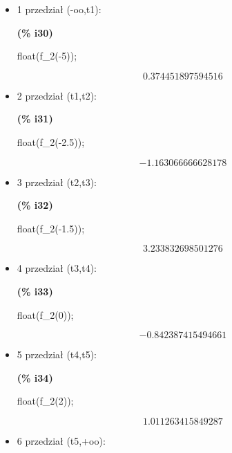 \documentclass[a4paper]{article}
\begin{document}
\begin{itemize}
	\item 1 przedział (-oo,t1):

\noindent
\begin{minipage}[t]{4.000000em}\color{red}\bfseries
(\% i30)	
\end{minipage}
\begin{minipage}[t]{\textwidth}\color{blue}
float(f\_2(-5));
\end{minipage}
\[\displaystyle \tag{\% o30} 
0.374451897594516\mbox{}
\]

\item 2 przedział (t1,t2):


\noindent
\begin{minipage}[t]{4.000000em}\color{red}\bfseries
(\% i31)	
\end{minipage}
\begin{minipage}[t]{\textwidth}\color{blue}
float(f\_2(-2.5));
\end{minipage}
\[\displaystyle \tag{\% o31} 
-1.163066666628178\mbox{}
\]
\item 3 przedział (t2,t3):


\noindent
\begin{minipage}[t]{4.000000em}\color{red}\bfseries
(\% i32)	
\end{minipage}
\begin{minipage}[t]{\textwidth}\color{blue}
float(f\_2(-1.5));
\end{minipage}
\[\displaystyle \tag{\% o32} 
3.233832698501276\mbox{}
\]
\item 4 przedział (t3,t4):


\noindent
\begin{minipage}[t]{4.000000em}\color{red}\bfseries
(\% i33)	
\end{minipage}
\begin{minipage}[t]{\textwidth}\color{blue}
float(f\_2(0));
\end{minipage}
\[\displaystyle \tag{\% o33} 
-0.842387415494661\mbox{}
\]
\item 5 przedział (t4,t5):


\noindent
\begin{minipage}[t]{4.000000em}\color{red}\bfseries
(\% i34)	
\end{minipage}
\begin{minipage}[t]{\textwidth}\color{blue}
float(f\_2(2));
\end{minipage}
\[\displaystyle \tag{\% o34} 
1.011263415849287\mbox{}
\]
\item 6 przedział (t5,+oo):



\end{itemize}
\end{document}
